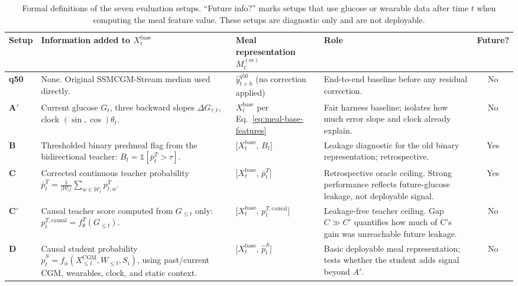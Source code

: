 \begin{table}[t]
\centering
\footnotesize
\renewcommand{\arraystretch}{1.35}
\caption{Formal definitions of the seven evaluation setups. ``Future info?'' marks setups
that use glucose or wearable data after time $t$ when computing the meal feature value.
These setups are diagnostic only and are not deployable.}
\label{tab:meal-setup-definitions}
\setlength{\tabcolsep}{4pt}
\begin{tabular}{@{}l p{3.8cm} p{4.0cm} p{3.2cm} c@{}}
\toprule
Setup & Information added to $X_t^{\mathrm{base}}$ & Meal representation $M_t^{(m)}$ & Role & Future? \\
\midrule
\textbf{q50}
  & None. Original SSMCGM-Stream median used directly.
  & $\widehat{y}_{t+h}^{q50}$ (no correction applied)
  & End-to-end baseline before any residual correction.
  & No \\[2pt]

\textbf{A$'$}
  & Current glucose $G_t$, three backward slopes $\Delta G_{\tau,t}$, clock $(\sin,\cos)\theta_t$.
  & $X_t^{\mathrm{base}}$ per Eq.~\eqref{eq:meal-base-features}
  & Fair harness baseline; isolates how much error slope and clock already explain.
  & No \\[2pt]

\textbf{B}
  & Thresholded binary predmeal flag from the bidirectional teacher: $B_t = \mathbb{1}\!\left[\bar{p}_t^T > \tau\right]$.
  & $\bigl[X_t^{\mathrm{base}},\,B_t\bigr]$
  & Leakage diagnostic for the old binary representation; retrospective.
  & Yes \\[2pt]

\textbf{C}
  & Corrected continuous teacher probability $\bar{p}_t^T = \frac{1}{|\mathcal{W}_t|}\sum_{w\in\mathcal{W}_t}p_{t,w}^T$.
  & $\bigl[X_t^{\mathrm{base}},\,\bar{p}_t^T\bigr]$
  & Retrospective oracle ceiling. Strong performance reflects future-glucose leakage, not deployable signal.
  & Yes \\[2pt]

\textbf{C$'$}
  & Causal teacher score computed from $G_{\le t}$ only: $p_t^{T,\mathrm{causal}} = f_\theta^T(G_{\le t})$.
  & $\bigl[X_t^{\mathrm{base}},\,p_t^{T,\mathrm{causal}}\bigr]$
  & Leakage-free teacher ceiling. Gap $C \gg C'$ quantifies how much of C's gain was unreachable future leakage.
  & No \\[2pt]

\textbf{D}
  & Causal student probability $\widehat{p}_t^S = f_\phi(X_{\le t}^{\mathrm{CGM}}, W_{\le t}, S_i)$, using past/current CGM, wearables, clock, and static context.
  & $\bigl[X_t^{\mathrm{base}},\,\widehat{p}_t^S\bigr]$
  & Basic deployable meal representation; tests whether the student adds signal beyond $A'$.
  & No \\[2pt]


\end{tabular}
\end{table}
